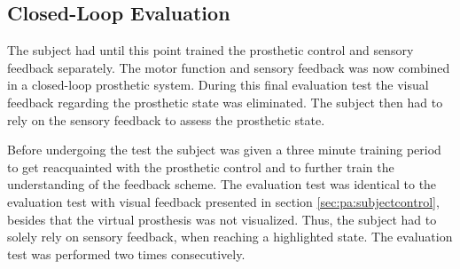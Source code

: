

\subsection{Closed-Loop Evaluation}

The subject had until this point trained the prosthetic control and sensory feedback separately. The motor function and sensory feedback was now combined in a closed-loop prosthetic system. During this final evaluation test the visual feedback regarding the prosthetic state was eliminated. The subject then had to rely on the sensory feedback to assess the prosthetic state. 

Before undergoing the test the subject was given a three minute training period to get reacquainted with the prosthetic control and to further train the understanding of the feedback scheme. 
The evaluation test was identical to the evaluation test with visual feedback presented in section \ref{sec:pa:subjectcontrol}, besides that the virtual prosthesis was not visualized. Thus, the subject had to solely rely on sensory feedback, when reaching a highlighted state. The evaluation test was performed two times consecutively.